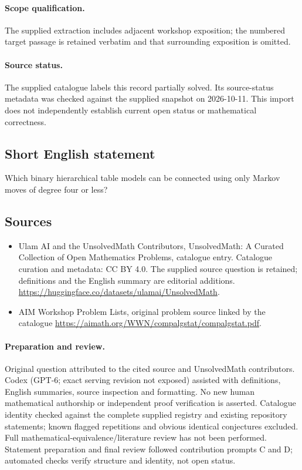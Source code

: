 \documentclass[11pt]{article}
\begin{document}
\paragraph{Scope qualification.}
The supplied extraction includes adjacent workshop exposition; the numbered target passage is retained verbatim and that surrounding exposition is omitted.
\paragraph{Source status.}
The supplied catalogue labels this record partially solved. Its source-status metadata was checked against the supplied snapshot on 2026-10-11. This import does not independently establish current open status or mathematical correctness.
\subsection{Short English statement}
Which binary hierarchical table models can be connected using only Markov moves of degree four or less?
\subsection{Sources}
\begin{itemize}
\item[S1] Ulam AI and the UnsolvedMath Contributors, UnsolvedMath: A Curated Collection of Open Mathematics Problems, catalogue entry. Catalogue curation and metadata: CC BY 4.0. The supplied source question is retained; definitions and the English summary are editorial additions.
\url{https://huggingface.co/datasets/ulamai/UnsolvedMath}.
\item[S2] AIM Workshop Problem Lists, original problem source linked by the catalogue
\url{https://aimath.org/WWN/compalgstat/compalgstat.pdf}.
\end{itemize}
\paragraph{Preparation and review.}
Original question attributed to the cited source and UnsolvedMath contributors. Codex (GPT-6; exact serving revision not exposed) assisted with definitions, English summaries, source inspection and formatting. No new human mathematical authorship or independent proof verification is asserted. Catalogue identity checked against the complete supplied registry and existing repository statements; known flagged repetitions and obvious identical conjectures excluded. Full mathematical-equivalence/literature review has not been performed. Statement preparation and final review followed contribution prompts C and D; automated checks verify structure and identity, not open status.
\label{end:statement}
\end{document}
